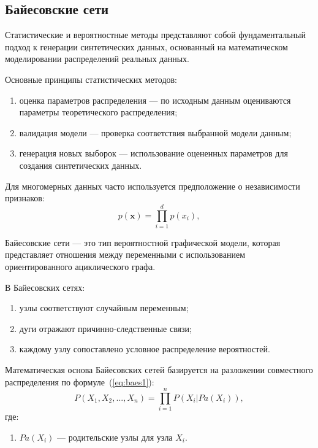

\subsection{Байесовские сети}

Статистические и вероятностные методы представляют собой фундаментальный подход к генерации синтетических данных, основанный на математическом моделировании распределений реальных данных.~\cite{uch}

Основные принципы статистических методов:
\begin{enumerate}[label*=---=]
	\item оценка параметров распределения --- по исходным данным оцениваются параметры теоретического распределения;
	\item валидация модели --- проверка соответствия выбранной модели данным;
	\item генерация новых выборок --- использование оцененных параметров для создания синтетических данных.
\end{enumerate}


Для многомерных данных часто используется предположение о независимости признаков:
\begin{equation}
	p(\mathbf{x}) = \prod_{i=1}^{d} p(x_i),
\end{equation}


Байесовские сети --- это тип вероятностной графической модели,
которая представляет отношения между переменными с использованием
ориентированного ациклического графа.~\cite{uch}


В Байесовских сетях:
\begin{enumerate}
	\item узлы соответствуют случайным переменным;
	\item дуги отражают причинно-следственные связи;
	\item каждому узлу сопоставлено условное распределение вероятностей.
\end{enumerate}

\newpage
Математическая основа Байесовских сетей базируется на разложении совместного распределения по формуле~(\ref{eq:baes1}):
\begin{equation}\label{eq:baes1}
    P(X_1, X_2, ..., X_n) = \prod_{i=1}^{n} P(X_i | Pa(X_i)),
\end{equation}
где:
\begin{enumerate}[label*=---]
	\item $Pa(X_i)$ --- родительские узлы для узла $X_i$.
\end{enumerate}


